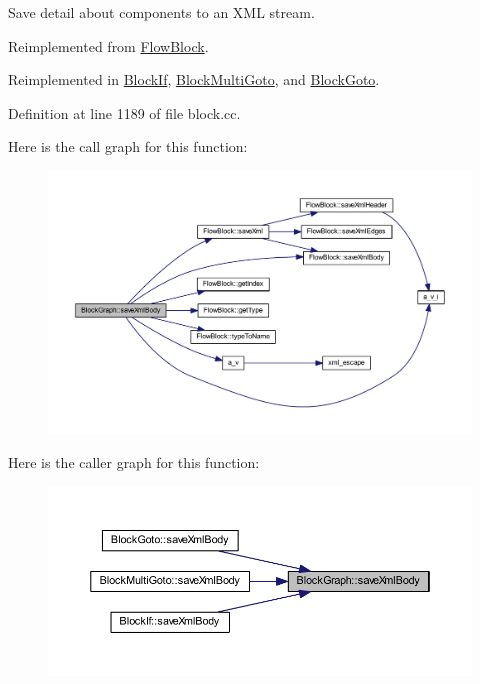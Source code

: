 Save detail about components to an X\+ML stream. 



Reimplemented from \mbox{\hyperlink{class_flow_block_a05d5939fe8f00edba7320799bf3f177b}{Flow\+Block}}.



Reimplemented in \mbox{\hyperlink{class_block_if_ae2abef245decb84faf212ce156389d9e}{Block\+If}}, \mbox{\hyperlink{class_block_multi_goto_ac537bd161b597061aeca88bcc01e260c}{Block\+Multi\+Goto}}, and \mbox{\hyperlink{class_block_goto_a4210ef977a85a74b9923e405057b093b}{Block\+Goto}}.



Definition at line 1189 of file block.\+cc.

Here is the call graph for this function\+:
\nopagebreak
\begin{figure}[H]
\begin{center}
\leavevmode
\includegraphics[width=350pt]{class_block_graph_a881076195239ce5c2e5c865f22714d03_cgraph}
\end{center}
\end{figure}
Here is the caller graph for this function\+:
\nopagebreak
\begin{figure}[H]
\begin{center}
\leavevmode
\includegraphics[width=350pt]{class_block_graph_a881076195239ce5c2e5c865f22714d03_icgraph}
\end{center}
\end{figure}
\mbox{\label{class_block_graph_a55618dfd49266bd4185d119f08e8b630}} 
